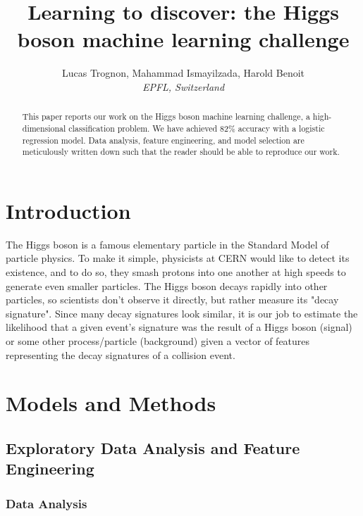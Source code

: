 \documentclass[10pt,conference,compsocconf]{IEEEtran}
\begin{document}
\title{Learning to discover: the Higgs
boson machine learning challenge}

\author{
  Lucas Trognon, Mahammad Ismayilzada, Harold Benoit\\
  \textit{EPFL, Switzerland}
}

\maketitle

\begin{abstract}
This paper reports our work on the Higgs boson machine learning challenge, a high-dimensional classification problem. We have achieved 82\% accuracy with a logistic regression model. Data analysis, feature engineering, and model selection are meticulously written down such that the reader should be able to reproduce our work.
\end{abstract}

\section{Introduction}
The Higgs boson is a famous elementary particle in the Standard Model of particle physics. To make it simple, physicists at CERN would like to detect its existence, and to do so, they smash protons into one another at
high speeds to generate even smaller particles\cite{project_presentation}. The Higgs boson decays rapidly into other particles, so scientists don't observe it directly,
but rather measure its "decay signature". Since many decay
signatures look similar, it is our job to estimate the likelihood that a given event's signature was the result of a
Higgs boson (signal) or some other process/particle (background) given a vector of features representing the decay signatures of a collision event.
\section{Models and Methods}

\subsection{Exploratory Data Analysis and Feature Engineering}


\subsubsection{Data Analysis}
\end{document}
